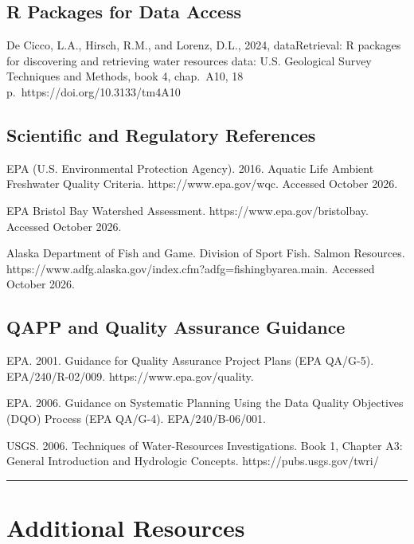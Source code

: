 \documentclass[
  letterpaper,
]{scrbook}
\begin{document}
\subsection{R Packages for Data
Access}\label{r-packages-for-data-access}

De Cicco, L.A., Hirsch, R.M., and Lorenz, D.L., 2024, dataRetrieval: R
packages for discovering and retrieving water resources data: U.S.
Geological Survey Techniques and Methods, book 4, chap.~A10, 18
p.~https://doi.org/10.3133/tm4A10

\subsection{Scientific and Regulatory
References}\label{scientific-and-regulatory-references}

EPA (U.S. Environmental Protection Agency). 2016. Aquatic Life Ambient
Freshwater Quality Criteria. https://www.epa.gov/wqc. Accessed October
2026.

EPA Bristol Bay Watershed Assessment. https://www.epa.gov/bristolbay.
Accessed October 2026.

Alaska Department of Fish and Game. Division of Sport Fish. Salmon
Resources.
https://www.adfg.alaska.gov/index.cfm?adfg=fishingbyarea.main. Accessed
October 2026.

\subsection{QAPP and Quality Assurance
Guidance}\label{qapp-and-quality-assurance-guidance}

EPA. 2001. Guidance for Quality Assurance Project Plans (EPA QA/G-5).
EPA/240/R-02/009. https://www.epa.gov/quality.

EPA. 2006. Guidance on Systematic Planning Using the Data Quality
Objectives (DQO) Process (EPA QA/G-4). EPA/240/B-06/001.

USGS. 2006. Techniques of Water-Resources Investigations. Book 1,
Chapter A3: General Introduction and Hydrologic Concepts.
https://pubs.usgs.gov/twri/

\begin{center}\rule{0.5\linewidth}{0.5pt}\end{center}

\section{Additional Resources}\label{additional-resources}
\end{document}
